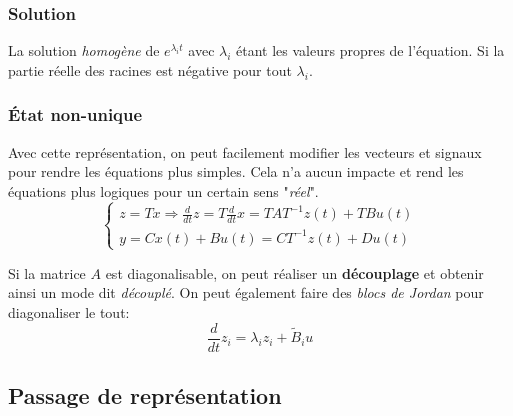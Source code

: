 \documentclass{report}
\begin{document}
\subsubsection{Solution}
La solution \textit{homogène} de $e^{\lambda_it}$ avec $\lambda_i$ étant les valeurs propres de l'équation. Si la partie réelle des racines est négative pour tout $\lambda_i$.

\subsubsection{État non-unique}
Avec cette représentation, on peut facilement modifier les vecteurs et signaux pour rendre les équations plus simples. Cela n'a aucun impacte et rend les équations plus logiques pour un certain sens "\textit{réel}".
\begin{equation} \label{eqn:nonunique}
\begin{cases}
z = Tx \Rightarrow \frac{d}{dt}z = T\frac{d}{dt}x = TAT^{-1}z(t) + TBu(t)\\
y = Cx(t) + Bu(t) = CT^{-1}z(t) + Du(t) 
\end{cases}
\end{equation}

Si la matrice $A$ est diagonalisable, on peut réaliser un \textbf{découplage} et obtenir ainsi un mode dit \textit{découplé}. On peut également faire des \textit{blocs de Jordan} pour diagonaliser le tout:
\begin{equation}
\frac{d}{dt} z_i = \lambda_i z_i + \tilde{B}_i u
\end{equation}

\subsection{Passage de représentation}
\end{document}
